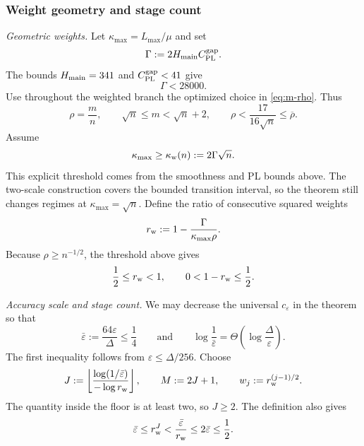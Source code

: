 \documentclass{article}
\theoremstyle{definition}
\begin{document}
\subsubsection{Weight geometry and stage count}

\emph{Geometric weights.}
Let $\kappa_{\max}=L_{\max}/\mu$ and set
\begin{equation}
 \Gamma:=2H_{\rm main}C_{\rm PL}^{\rm gap}.
 \label{eq:pl-gamma}
\end{equation}
The bounds $H_{\rm main}=341$ and $C_{\rm PL}^{\rm gap}<41$ give
\begin{equation}
 \Gamma<28000.
 \label{eq:gamma-upper-bound}
\end{equation}
Use throughout the weighted branch the optimized choice in
\eqref{eq:m-rho}.  Thus
\begin{equation}
 \rho=\frac mn,
 \qquad
 \sqrt n\le m<\sqrt n+2,
 \qquad
 \rho<\frac{17}{16\sqrt n}\le\overline\rho.
 \label{eq:weighted-fixed-bias}
\end{equation}
Assume
\begin{equation}
 \kappa_{\max}\ge\kappa_{\rm w}(n):=2\Gamma\sqrt n.
 \label{eq:weighted-kappa-threshold}
\end{equation}
This explicit threshold comes from the smoothness and PL bounds above.  The
two-scale construction covers the bounded transition interval, so the theorem
still changes regimes at $\kappa_{\max}=\sqrt n$.
Define the ratio of consecutive squared weights
\begin{equation}
 r_{\rm w}:=1-\frac{\Gamma}{\kappa_{\max}\rho}.
 \label{eq:weighted-geometric-ratio}
\end{equation}
Because $\rho\ge n^{-1/2}$, the threshold above gives
\begin{equation}
 \frac12\le r_{\rm w}<1,
 \qquad
 0<1-r_{\rm w}\le\frac12.
 \label{eq:weighted-ratio-range}
\end{equation}

\emph{Accuracy scale and stage count.}
We may decrease the universal $c_\varepsilon$ in the theorem so that
\begin{equation}
 \bar\varepsilon:=\frac{64\varepsilon}{\Delta}\le\frac14
 \qquad\text{and}\qquad
 \log\frac1{\bar\varepsilon}
 =\Theta\!\left(\log\frac{\Delta}{\varepsilon}\right).
 \label{eq:weighted-accuracy-range}
\end{equation}
The first inequality follows from $\varepsilon\le\Delta/256$.
Choose
\begin{equation}
 J:=\left\lfloor
 \frac{\log(1/\bar\varepsilon)}{-\log r_{\rm w}}
 \right\rfloor,
 \qquad
 M:=2J+1,
 \qquad
 w_j:=r_{\rm w}^{(j-1)/2}.
 \label{eq:weighted-stage-choice}
\end{equation}
The quantity inside the floor is at least two, so $J\ge2$.  The definition also
gives
\begin{equation}
 \bar\varepsilon\le r_{\rm w}^J
 <\frac{\bar\varepsilon}{r_{\rm w}}
 \le2\bar\varepsilon\le\frac12.
 \label{eq:weighted-floor-window}
\end{equation}
\end{document}
